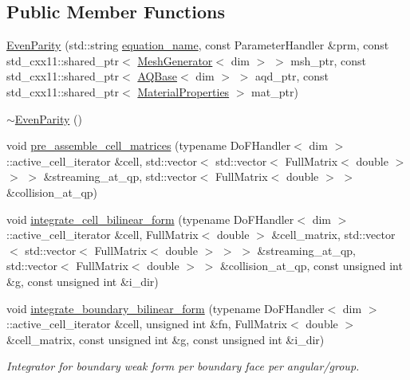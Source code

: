 \subsection*{Public Member Functions}
\begin{DoxyCompactItemize}
\item 
\hyperlink{class_even_parity_a2877e7e239900be85cc84471fe670abd}{Even\+Parity} (std\+::string \hyperlink{class_equation_base_a0a72472959e531f5256400dec911f3a5}{equation\+\_\+name}, const Parameter\+Handler \&prm, const std\+\_\+cxx11\+::shared\+\_\+ptr$<$ \hyperlink{class_mesh_generator}{Mesh\+Generator}$<$ dim $>$ $>$ msh\+\_\+ptr, const std\+\_\+cxx11\+::shared\+\_\+ptr$<$ \hyperlink{class_a_q_base}{A\+Q\+Base}$<$ dim $>$ $>$ aqd\+\_\+ptr, const std\+\_\+cxx11\+::shared\+\_\+ptr$<$ \hyperlink{class_material_properties}{Material\+Properties} $>$ mat\+\_\+ptr)
\item 
\hyperlink{class_even_parity_a9c3caf641043e0a1e44632478946576b}{$\sim$\+Even\+Parity} ()
\item 
void \hyperlink{class_even_parity_a4cc64002161193e2227e962c9ecb8cf5}{pre\+\_\+assemble\+\_\+cell\+\_\+matrices} (typename Do\+F\+Handler$<$ dim $>$\+::active\+\_\+cell\+\_\+iterator \&cell, std\+::vector$<$ std\+::vector$<$ Full\+Matrix$<$ double $>$ $>$ $>$ \&streaming\+\_\+at\+\_\+qp, std\+::vector$<$ Full\+Matrix$<$ double $>$ $>$ \&collision\+\_\+at\+\_\+qp)
\item 
void \hyperlink{class_even_parity_adb381ea4f45e5ae3741b1d30a0de02b6}{integrate\+\_\+cell\+\_\+bilinear\+\_\+form} (typename Do\+F\+Handler$<$ dim $>$\+::active\+\_\+cell\+\_\+iterator \&cell, Full\+Matrix$<$ double $>$ \&cell\+\_\+matrix, std\+::vector$<$ std\+::vector$<$ Full\+Matrix$<$ double $>$ $>$ $>$ \&streaming\+\_\+at\+\_\+qp, std\+::vector$<$ Full\+Matrix$<$ double $>$ $>$ \&collision\+\_\+at\+\_\+qp, const unsigned int \&g, const unsigned int \&i\+\_\+dir)
\item 
void \hyperlink{class_even_parity_ae800cb49f85cf417167ca5385b50df6f}{integrate\+\_\+boundary\+\_\+bilinear\+\_\+form} (typename Do\+F\+Handler$<$ dim $>$\+::active\+\_\+cell\+\_\+iterator \&cell, unsigned int \&fn, Full\+Matrix$<$ double $>$ \&cell\+\_\+matrix, const unsigned int \&g, const unsigned int \&i\+\_\+dir)
\begin{DoxyCompactList}\small\item\em Integrator for boundary weak form per boundary face per angular/group. \end{DoxyCompactList}\item 

\end{DoxyCompactItemize}
